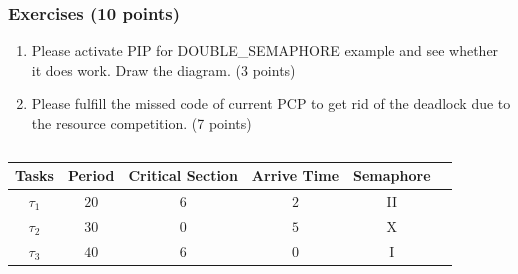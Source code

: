 \documentclass[t]{beamer}
\begin{document}
\begin{frame}
\frametitle{Exercises (10 points)}
\begin{enumerate}
\item Please activate PIP for DOUBLE\_SEMAPHORE example and see whether it does work. Draw the diagram. (3 points)
\item Please fulfill the missed code of current PCP to get rid of the deadlock due to the resource competition. (7 points)
\end{enumerate}
\begin{columns}
    \column{\textwidth}
  \begin{table}
    \centering
    \begin{tabular}{|c|c|c|c|c|c|}
      \hline
     Tasks & Period & Critical Section & Arrive Time & Semaphore\\
     \hline
     $\tau_1$ & $20$ & $6$ & $2$ & II\\
     \hline
     $\tau_2$ & $30$ & $0$ & $5$ & X\\
     \hline
     $\tau_3$ & $40$ & $6$ & $0$ & I\\
     \hline
    \end{tabular}
  \end{table}
  \end{columns}
\end{frame}
\end{document}
